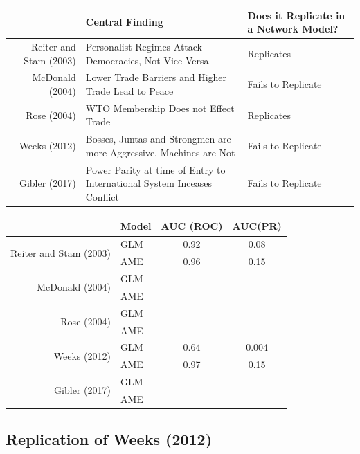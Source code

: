 \documentclass[12pt]{amsart}
\begin{document}
\begin{table}[ht]
\centering
\begin{tabular}{r p{4cm} l}
  \hline
 & Central Finding & Does it Replicate in a Network Model? \\ 
  \hline
Reiter and Stam (2003) & Personalist Regimes Attack Democracies, Not Vice Versa & Replicates \\ 
  McDonald (2004) & Lower Trade Barriers and Higher Trade Lead to Peace & Fails to Replicate \\ 
  Rose (2004) & WTO Membership Does not Effect Trade & Replicates \\ 
  Weeks (2012) & Bosses, Juntas and Strongmen are more Aggressive, Machines are Not & Fails to Replicate \\ 
  Gibler (2017) & Power Parity at time of Entry to International System Inceases Conflict & Fails to Replicate \\ 
   \hline
\end{tabular}
\end{table}

\begin{table}[ht]
\centering
\begin{tabular}{rl cc}
  \hline
 & Model & AUC (ROC) & AUC(PR) \\ 
  \hline
\multirow{2}{*}{Reiter and Stam (2003)} & GLM & 0.92 & 0.08 \\ 
~  & AME & 0.96 &  0.15 \\ 
\multirow{2}{*}{McDonald (2004)} & GLM & &  \\ 
~  & AME & &  \\ 
\multirow{2}{*}{Rose (2004)} & GLM & &  \\ 
~  & AME & &  \\ 
\multirow{2}{*}{Weeks (2012)} & GLM & 0.64 & 0.004  \\ 
~  & AME & 0.97 &  0.15 \\ 
\multirow{2}{*}{Gibler (2017)} & GLM & &  \\ 
~  & AME & &  \\ 
   \hline
\end{tabular}
\end{table}

\subsection{Replication of Weeks (2012)}
\end{document}
